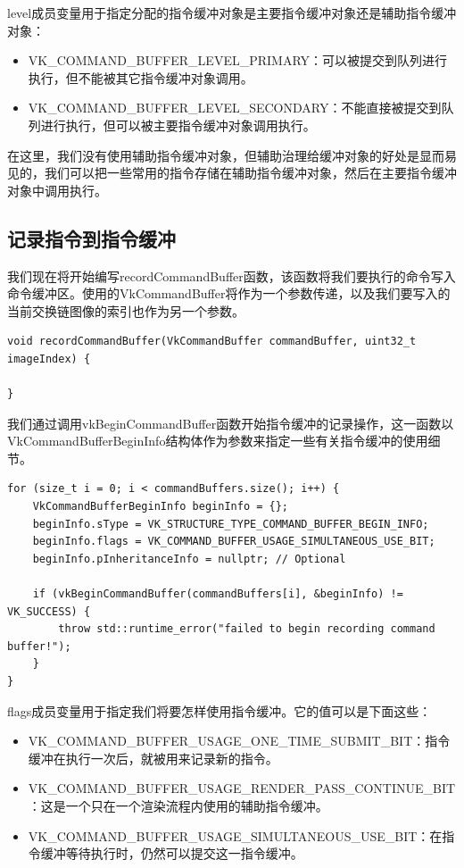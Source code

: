 \documentclass{ctexart}
\begin{document}
level成员变量用于指定分配的指令缓冲对象是主要指令缓冲对象还是辅助指令缓冲对象：

\begin{itemize}
	\item VK\_COMMAND\_BUFFER\_LEVEL\_PRIMARY：可以被提交到队列进行执行，但不能被其它指令缓冲对象调用。
	\item VK\_COMMAND\_BUFFER\_LEVEL\_SECONDARY：不能直接被提交到队列进行执行，但可以被主要指令缓冲对象调用执行。
\end{itemize}

在这里，我们没有使用辅助指令缓冲对象，但辅助治理给缓冲对象的好处是显而易见的，我们可以把一些常用的指令存储在辅助指令缓冲对象，然后在主要指令缓冲对象中调用执行。

\subsection{记录指令到指令缓冲}

我们现在将开始编写recordCommandBuffer函数，该函数将我们要执行的命令写入命令缓冲区。使用的VkCommandBuffer将作为一个参数传递，以及我们要写入的当前交换链图像的索引也作为另一个参数。
\begin{lstlisting}[language={[ANSI]C}]
void recordCommandBuffer(VkCommandBuffer commandBuffer, uint32_t imageIndex) {

}
\end{lstlisting}

我们通过调用vkBeginCommandBuffer函数开始指令缓冲的记录操作，这一函数以VkCommandBufferBeginInfo结构体作为参数来指定一些有关指令缓冲的使用细节。

\begin{lstlisting}[language={[ANSI]C}]
for (size_t i = 0; i < commandBuffers.size(); i++) {
	VkCommandBufferBeginInfo beginInfo = {};
	beginInfo.sType = VK_STRUCTURE_TYPE_COMMAND_BUFFER_BEGIN_INFO;
	beginInfo.flags = VK_COMMAND_BUFFER_USAGE_SIMULTANEOUS_USE_BIT;
	beginInfo.pInheritanceInfo = nullptr; // Optional

	if (vkBeginCommandBuffer(commandBuffers[i], &beginInfo) != VK_SUCCESS) {
		throw std::runtime_error("failed to begin recording command buffer!");
	}
}
\end{lstlisting}

flags成员变量用于指定我们将要怎样使用指令缓冲。它的值可以是下面这些：

\begin{itemize}
	\item VK\_COMMAND\_BUFFER\_USAGE\_ONE\_TIME\_SUBMIT\_BIT：指令缓冲在执行一次后，就被用来记录新的指令。
	\item VK\_COMMAND\_BUFFER\_USAGE\_RENDER\_PASS\_CONTINUE\_BIT：这是一个只在一个渲染流程内使用的辅助指令缓冲。
	\item VK\_COMMAND\_BUFFER\_USAGE\_SIMULTANEOUS\_USE\_BIT：在指令缓冲等待执行时，仍然可以提交这一指令缓冲。
\end{itemize}
\end{document}
